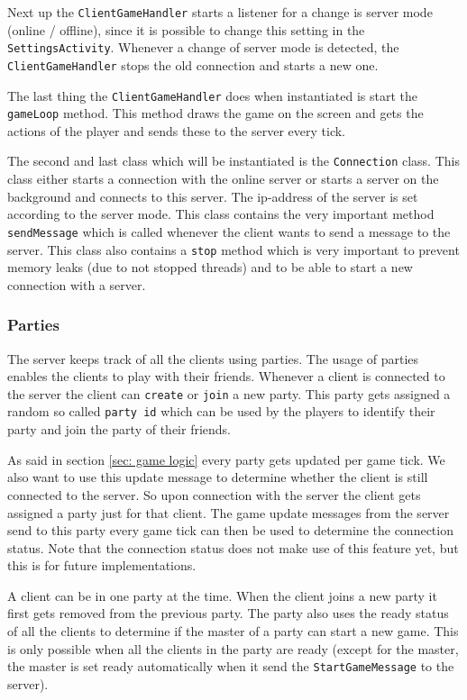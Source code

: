 \documentclass[../main.tex]{subfiles}
\begin{document}
        Next up the \texttt{ClientGameHandler} starts a listener for a change is server mode (online / offline), since it is possible to change this setting in the \texttt{SettingsActivity}. Whenever a change of server mode is detected, the \texttt{ClientGameHandler} stops the old connection and starts a new one. 
        
        The last thing the \texttt{ClientGameHandler} does when instantiated is start the \texttt{gameLoop} method. This method draws the game on the screen and gets the actions of the player and sends these to the server every tick.

        The second and last class which will be instantiated is the \texttt{Connection} class. This class either starts a connection with the online server or starts a server on the background and connects to this server. The ip-address of the server is set according to the server mode. This class contains the very important method \texttt{sendMessage} which is called whenever the client wants to send a message to the server. This class also contains a \texttt{stop} method which is very important to prevent memory leaks (due to not stopped threads) and to be able to start a new connection with a server. 

        \subsubsection{Parties}
        The server keeps track of all the clients using parties. The usage of parties enables the clients to play with their friends. Whenever a client is connected to the server the client can \texttt{create} or \texttt{join} a new party. This party gets assigned a random so called \texttt{party id} which can be used by the players to identify their party and join the party of their friends.
        
        As said in section \ref{sec: game logic} every party gets updated per game tick. We also want to use this update message to determine whether the client is still connected to the server. So upon connection with the server the client gets assigned a party just for that client. The game update messages from the server send to this party every game tick can then be used to determine the connection status. Note that the connection status does not make use of this feature yet, but this is for future implementations.

        A client can be in one party at the time. When the client joins a new party it first gets removed from the previous party. The party also uses the ready status of all the clients to determine if the master of a party can start a new game. This is only possible when all the clients in the party are ready (except for the master, the master is set ready automatically when it send the \texttt{StartGameMessage} to the server).
\end{document}
